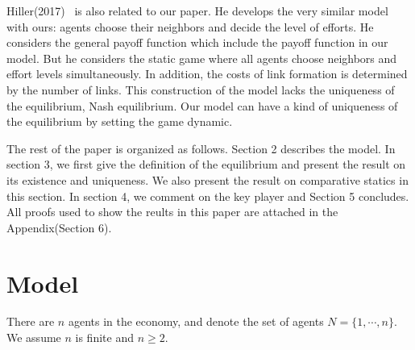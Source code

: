 \documentclass[12pt]{article}
\theoremstyle{definition}
\begin{document}
Hiller(2017)~\cite{hiller} is also related to our paper.
He develops the very similar model with ours: agents choose their neighbors and decide the level of efforts.
He considers the general payoff function which include the payoff function in our model.
But he considers the static game where all agents choose neighbors and effort levels simultaneously.
In addition, the costs of link formation is determined by the number of links.
This construction of the model lacks the uniqueness of the equilibrium, Nash equilibrium.
Our model can have a kind of uniqueness of the equilibrium by setting the game dynamic.

The rest of the paper is organized as follows.
Section 2 describes the model.
In section 3, we first give the definition of the equilibrium and present the result on its existence and uniqueness.
We also present the result on comparative statics in this section.
In section 4, we comment on the key player and Section 5 concludes.
All proofs used to show the reults in this paper are attached in the Appendix(Section 6).


\section{Model}

There are $n$ agents in the economy, and denote the set of agents $N = \{ 1, \cdots, n\}$.
We assume $n$ is finite and $n \ge 2$.
\end{document}
